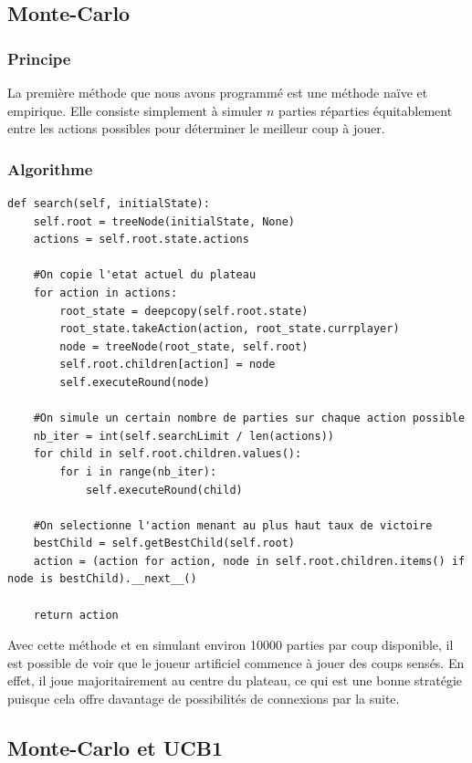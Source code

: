 \documentclass[a4paper]{article}
\theoremstyle{definition}
\begin{document}
\subsection{Monte-Carlo}

\subsubsection{Principe}

La première méthode que nous avons programmé est une méthode naïve et empirique. Elle consiste simplement à simuler $n$ parties réparties équitablement entre les actions possibles pour déterminer le meilleur coup à jouer.

\subsubsection{Algorithme}

\begin{lstlisting}
def search(self, initialState):
	self.root = treeNode(initialState, None)
	actions = self.root.state.actions
	
	#On copie l'etat actuel du plateau
	for action in actions:
		root_state = deepcopy(self.root.state)
		root_state.takeAction(action, root_state.currplayer)
		node = treeNode(root_state, self.root)
		self.root.children[action] = node
		self.executeRound(node)
		
	#On simule un certain nombre de parties sur chaque action possible
	nb_iter = int(self.searchLimit / len(actions))
	for child in self.root.children.values():
		for i in range(nb_iter):
			self.executeRound(child)
		
	#On selectionne l'action menant au plus haut taux de victoire
	bestChild = self.getBestChild(self.root)
	action = (action for action, node in self.root.children.items() if node is bestChild).__next__()
		
	return action
\end{lstlisting}

Avec cette méthode et en simulant environ 10000 parties par coup disponible, il est possible de voir que le joueur artificiel commence à jouer des coups sensés. En effet, il joue majoritairement au centre du plateau, ce qui est une bonne stratégie puisque cela offre davantage de possibilités de connexions par la suite.

\newpage 


\subsection{Monte-Carlo et UCB1}
\end{document}
